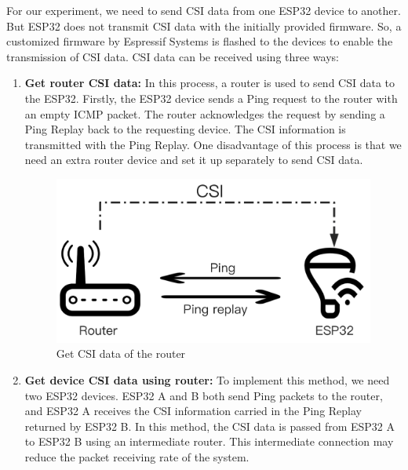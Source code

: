 For our experiment, we need to send CSI data from one ESP32 device to another. But ESP32 does not transmit CSI data with the initially provided firmware. So, a customized firmware by Espressif Systems \cite{esp-csi} is flashed to the devices to enable the transmission of CSI data. CSI data can be received using three ways:
\begin{enumerate}

\item \textbf{Get router CSI data:} In this process, a router is used to send CSI data to the ESP32. Firstly, the ESP32 device sends a Ping request to the router with an empty ICMP packet. The router acknowledges the request by sending a Ping Replay back to the requesting device. The CSI information is transmitted with the Ping Replay. One disadvantage of this process is that we need an extra router device and set it up separately to send CSI data.

\begin{figure}[H]
\centering
\includegraphics[width=1.0\textwidth]{./figure/chap 4/get_router_csi.png}
\caption{Get CSI data of the router}
\label{Fig 4.1}
\end{figure}

\item \textbf{Get device CSI data using router:} To implement this method, we need two ESP32 devices. ESP32 A and B both send Ping packets to the router, and ESP32 A receives the CSI information carried in the Ping Replay returned by ESP32 B. In this method, the CSI data is passed from ESP32 A to ESP32 B using an intermediate router. This intermediate connection may reduce the packet receiving rate of the system.


\end{enumerate}

